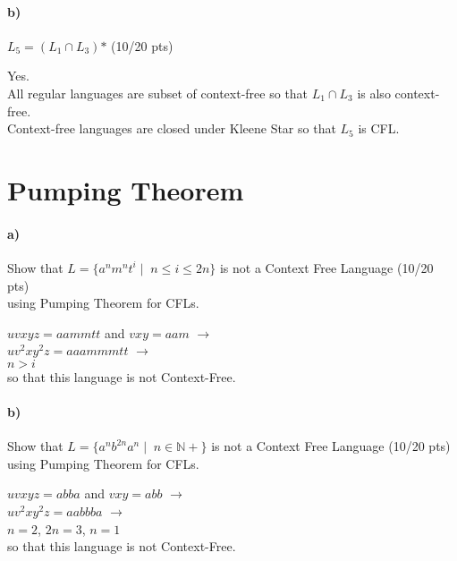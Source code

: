 \documentclass[a4paper,12pt]{article}
\begin{document}
\paragraph{b)} $L_5 = (L_1 \cap L_3)\text{*}$ \hfill \small{(10/20 pts)} \\

\begin{tcolorbox}
Yes.\\
All regular languages are subset of context-free so that $L_1 \cap L_3$ is also context-free. \\
Context-free languages are closed under Kleene Star so that $L_5$ is CFL.
\end{tcolorbox}





\newpage
\section{Pumping Theorem \hfill {}}

\paragraph{a)} Show that $L=\{a^n m^n t^i \mid \; n\leq i \leq 2n\}$ is not a Context Free Language \hfill \small{(10/20 pts)} \\
using Pumping Theorem for CFLs. \\

\begin{tcolorbox}
$uvxyz=aammtt$ and $vxy=aam$ $\rightarrow$ \\
$uv^2xy^2z=aaammmtt$ $\rightarrow$ \\
$n > i$\\
so that this language is not Context-Free.
\end{tcolorbox}


\paragraph{b)} Show that $L=\{a^n b^{2n} a^n \mid \; n \in \mathbb{N+} \}$ is not a Context Free Language \hfill \small{(10/20 pts)} \\
using Pumping Theorem for CFLs. \\

\begin{tcolorbox}
$uvxyz=abba$ and $vxy = abb$ $\rightarrow$\\
$uv^2xy^2z=aabbba$ $\rightarrow$ \\
$n = 2$, $2n = 3$, $n=1$ \\
so that this language is not Context-Free.
\end{tcolorbox}
\end{document}

